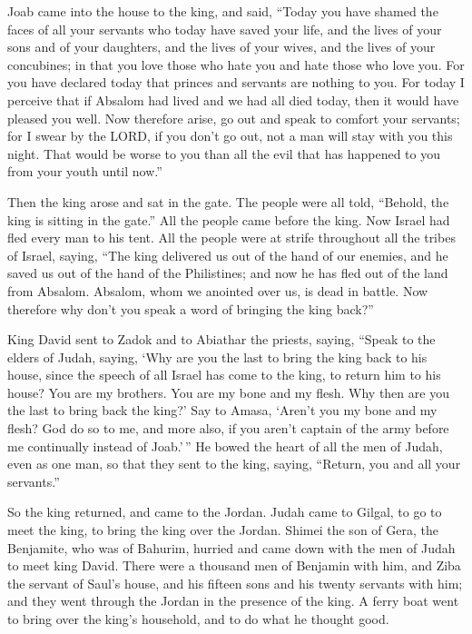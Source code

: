  Joab came into the house to the king, and said, ``Today
you have shamed the faces of all your servants who today have saved your
life, and the lives of your sons and of your daughters, and the lives of
your wives, and the lives of your concubines;  in that you
love those who hate you and hate those who love you. For you have
declared today that princes and servants are nothing to you. For today I
perceive that if Absalom had lived and we had all died today, then it
would have pleased you well.  Now therefore arise, go out
and speak to comfort your servants; for I swear by the LORD, if you
don't go out, not a man will stay with you this night. That would be
worse to you than all the evil that has happened to you from your youth
until now.''

 Then the king arose and sat in the gate. The people were
all told, ``Behold, the king is sitting in the gate.'' All the people
came before the king. Now Israel had fled every man to his tent.
 All the people were at strife throughout all the tribes
of Israel, saying, ``The king delivered us out of the hand of our
enemies, and he saved us out of the hand of the Philistines; and now he
has fled out of the land from Absalom.  Absalom, whom we
anointed over us, is dead in battle. Now therefore why don't you speak a
word of bringing the king back?''

 King David sent to Zadok and to Abiathar the priests,
saying, ``Speak to the elders of Judah, saying, `Why are you the last to
bring the king back to his house, since the speech of all Israel has
come to the king, to return him to his house?  You are my
brothers. You are my bone and my flesh. Why then are you the last to
bring back the king?'  Say to Amasa, `Aren't you my bone
and my flesh? God do so to me, and more also, if you aren't captain of
the army before me continually instead of Joab.'\,''  He
bowed the heart of all the men of Judah, even as one man, so that they
sent to the king, saying, ``Return, you and all your servants.''

 So the king returned, and came to the Jordan. Judah came
to Gilgal, to go to meet the king, to bring the king over the Jordan.
 Shimei the son of Gera, the Benjamite, who was of
Bahurim, hurried and came down with the men of Judah to meet king David.
 There were a thousand men of Benjamin with him, and Ziba
the servant of Saul's house, and his fifteen sons and his twenty
servants with him; and they went through the Jordan in the presence of
the king.  A ferry boat went to bring over the king's
household, and to do what he thought good.

